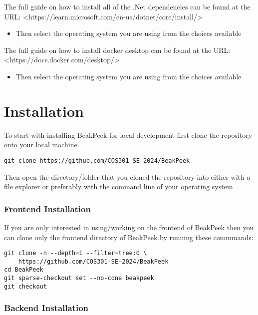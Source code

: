 \documentclass{article}
\begin{document}
The full guide on how to install all of the .Net dependencies can be found at
the URL:
<https://learn.microsoft.com/en-us/dotnet/core/install/>

\begin{itemize}
    \item Then select the operating system you are using from the choices available
\end{itemize}

The full guide on how to install docker desktop can be found at the URL:
<https://docs.docker.com/desktop/>

\begin{itemize}
    \item Then select the operating system you are using from the choices available
\end{itemize}

\section{Installation}

To start with installing BeakPeek for local development first clone the
repository onto your local machine.


\begin{lstlisting}
git clone https://github.com/COS301-SE-2024/BeakPeek
\end{lstlisting}

Then open the directory/folder that you cloned the repository into either with a
file explorer or preferably with the command line of your operating system

\subsubsection{Frontend Installation}

If you are only interested in using/working on the frontend of BeakPeek then you
can clone only the frontend directory of BeakPeek by running these commmands:

\begin{lstlisting}
git clone -n --depth=1 --filter=tree:0 \
    https://github.com/COS301-SE-2024/BeakPeek
cd BeakPeek
git sparse-checkout set --no-cone beakpeek
git checkout
\end{lstlisting}

\subsubsection{Backend Installation}
\end{document}
